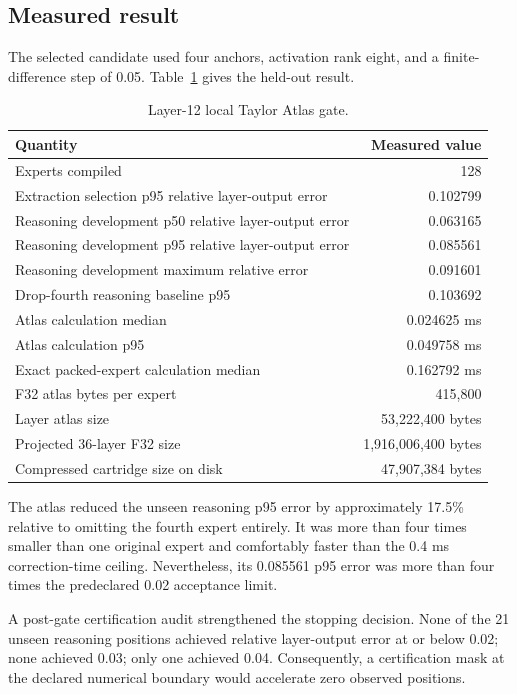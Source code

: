 \subsection{Measured result}

The selected candidate used four anchors, activation rank eight, and a finite-
difference step of 0.05.  Table~\ref{tab:taylor-atlas-result} gives the held-out result.

\begin{table}[ht]
\centering
\caption{Layer-12 local Taylor Atlas gate.}
\label{tab:taylor-atlas-result}
\begin{tabular}{@{}lr@{}}
\toprule
Quantity & Measured value \\
\midrule
Experts compiled & 128 \\
Extraction selection p95 relative layer-output error & 0.102799 \\
Reasoning development p50 relative layer-output error & 0.063165 \\
Reasoning development p95 relative layer-output error & 0.085561 \\
Reasoning development maximum relative error & 0.091601 \\
Drop-fourth reasoning baseline p95 & 0.103692 \\
Atlas calculation median & 0.024625 ms \\
Atlas calculation p95 & 0.049758 ms \\
Exact packed-expert calculation median & 0.162792 ms \\
F32 atlas bytes per expert & 415,800 \\
Layer atlas size & 53,222,400 bytes \\
Projected 36-layer F32 size & 1,916,006,400 bytes \\
Compressed cartridge size on disk & 47,907,384 bytes \\
\bottomrule
\end{tabular}
\end{table}

The atlas reduced the unseen reasoning p95 error by approximately 17.5\% relative to
omitting the fourth expert entirely.  It was more than four times smaller than one
original expert and comfortably faster than the 0.4 ms correction-time ceiling.
Nevertheless, its 0.085561 p95 error was more than four times the predeclared 0.02
acceptance limit.

A post-gate certification audit strengthened the stopping decision.  None of the 21
unseen reasoning positions achieved relative layer-output error at or below 0.02;
none achieved 0.03; only one achieved 0.04.  Consequently, a certification mask at
the declared numerical boundary would accelerate zero observed positions.

